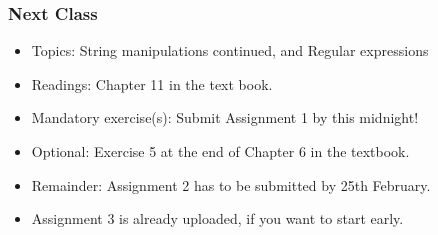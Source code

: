 \documentclass{beamer}
\begin{document}
\begin{frame}
\frametitle{Next Class}
\begin{itemize}
\item Topics: String manipulations continued, and Regular expressions
\item Readings: Chapter 11 in the text book.
\item Mandatory exercise(s): Submit Assignment 1 by this midnight! 
\item Optional: Exercise 5 at the end of Chapter 6 in the textbook.
\item Remainder: Assignment 2 has to be submitted by 25th February. 
\item Assignment 3 is already uploaded, if you want to start early.  
\end{itemize}
\end{frame}
\end{document}
